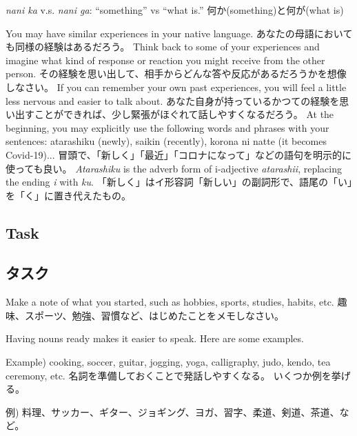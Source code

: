 \documentclass[uplatex,dvipdfmx,b5paper,english,10pt]{jsbook}
\begin{document}
\begin{note}
\ifEnglish
{\it nani ka\/} v.s. {\it nani ga\/}: ``something'' vs ``what is.''
\else
何か(something)と何が(what is)
\fi
\end{note}

\begin{toianswer}
\ifEnglish
You may have similar experiences in your native language.
\else
あなたの母語においても同様の経験はあるだろう。
\fi
\ifEnglish
Think back to some of your experiences and imagine what kind of response or reaction you might receive from the other person.
\else
その経験を思い出して、相手からどんな答や反応があるだろうかを想像しなさい。
\fi
\ifEnglish
If you can remember your own past experiences, you will feel a little less nervous and easier to talk about.
\else
あなた自身が持っているかつての経験を思い出すことができれば、少し緊張がほぐれて話しやすくなるだろう。
\fi
\ifEnglish
At the beginning,
you may explicitly use the following words and phrases with your sentences:
atarashiku (newly), saikin (recently), korona ni natte (it becomes Covid-19)...
\else
冒頭で、「新しく」「最近」「コロナになって」などの語句を明示的に使っても良い。
\fi
\ifEnglish
{\it Atarashiku\/} is the adverb form of i-adjective {\it atarashii\/}, replacing the ending {\it i\/} with {\it ku\/}.
\else
「新しく」はイ形容詞「新しい」の副詞形で、語尾の「い」を「く」に置き代えたもの。
\fi
\end{toianswer}

\ifEnglish
\subsection{Task}
\else
\subsection{タスク}
\fi

\begin{toiquestion}
\ifEnglish
Make a note of what you started, such as hobbies, sports, studies, habits, etc.
\else
趣味、スポーツ、勉強、習慣など、はじめたことをメモしなさい。
\fi
\end{toiquestion}

\begin{toianswer} %
\ifEnglish
Having nouns ready makes it easier to speak.
Here are some examples.

Example) cooking, soccer, guitar, jogging, yoga, calligraphy, judo, kendo, tea ceremony, etc.
\else
名詞を準備しておくことで発話しやすくなる。
いくつか例を挙げる。

例) 料理、サッカー、ギター、ジョギング、ヨガ、習字、柔道、剣道、茶道、など。
\fi
\end{toianswer}
\end{document}
